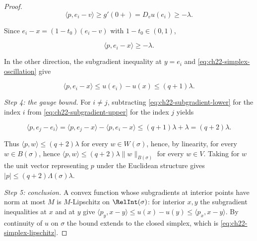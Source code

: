 \begin{proof}
\[
 \langle p,e_i-v\rangle\geq g'(0+)=D_vu(e_i)\geq-\lambda .
\]

Since \(e_i-x=(1-t_0)(e_i-v)\) with \(1-t_0\in(0,1)\),

\[
 \langle p,e_i-x\rangle\geq-\lambda .
\tag{22.15}\label{eq:ch22-subgradient-lower}
\]

In the other direction, the subgradient inequality at \(y=e_i\) and
\eqref{eq:ch22-simplex-oscillation} give

\[
 \langle p,e_i-x\rangle\leq u(e_i)-u(x)\leq(q+1)\lambda .
\tag{22.16}\label{eq:ch22-subgradient-upper}
\]

\emph{Step 4: the gauge bound.}  For \(i\neq j\), subtracting
\eqref{eq:ch22-subgradient-lower} for the index \(i\) from
\eqref{eq:ch22-subgradient-upper} for the index \(j\) yields

\[
 \langle p,e_j-e_i\rangle
   =\langle p,e_j-x\rangle-\langle p,e_i-x\rangle
   \leq(q+1)\lambda+\lambda=(q+2)\lambda .
\tag{22.17}\label{eq:ch22-subgradient-edges}
\]

Thus \(\langle p,w\rangle\leq(q+2)\lambda\) for every \(w\in W(\sigma)\),
hence, by linearity, for every \(w\in B(\sigma)\), hence
\(\langle p,w\rangle\leq(q+2)\lambda\|w\|_{B(\sigma)}\) for every
\(w\in V\).  Taking for \(w\) the unit vector representing \(p\) under the
Euclidean structure gives
\(|p|\leq(q+2)\Lambda(\sigma)\lambda\).

\emph{Step 5: conclusion.}  A convex function whose subgradients at interior
points have norm at most \(M\) is \(M\)-Lipschitz on \(\RelInt(\sigma)\):
for interior \(x,y\) the subgradient inequalities at \(x\) and at \(y\) give
\(\langle p_y,x-y\rangle\leq u(x)-u(y)\leq\langle p_x,x-y\rangle\).  By
continuity of \(u\) on \(\sigma\) the bound extends to the closed simplex,
which is \eqref{eq:ch22-simplex-lipschitz}.
\end{proof}

